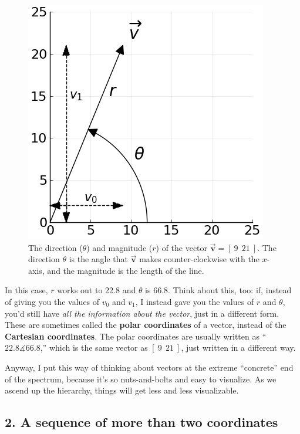 \begin{figure}[ht]
\centering
\includegraphics[width=.7\textwidth]{directionMag.png}
\caption[.]{The direction ($\theta$) and magnitude ($r$) of the vector
$\overrightarrow{\textbf{v}} = [\ 9 \ \ 21\ ]$. The direction $\theta$ is the
angle that $\overrightarrow{\textbf{v}}$ makes counter-clockwise with the
$x$-axis, and the magnitude is the length of the line.}
\label{fig:directionMag}
\end{figure}
\smallskip


In this case, $r$ works out to 22.8 and $\theta$ is 66.8\textdegree. Think
about this, too: if, instead of giving you the values of $v_0$ and $v_1$, I
instead gave you the values of $r$ and $\theta$, you'd still have \textit{all
the information about the vector}, just in a different form. These are
sometimes called the \textbf{polar coordinates} of a vector, instead of the
\textbf{Cartesian coordinates}. The polar coordinates are usually written as
``$22.8 \measuredangle 66.8$\textdegree,'' which is the same vector as $[\ 9 \
\ 21 \ ]$, just written in a different way.

Anyway, I put this way of thinking about vectors at the extreme ``concrete''
end of the spectrum, because it's so nuts-and-bolts and easy to visualize. As
we ascend up the hierarchy, things will get less and less visualizable.


\subsection{2. A sequence of more than two coordinates}

